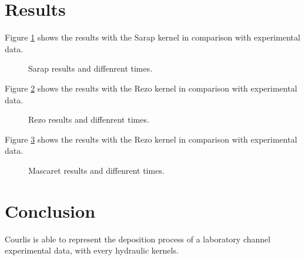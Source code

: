 \section{Results}

Figure \ref{soni:fig:sarap} shows the results with the Sarap kernel
in comparison with experimental data.

\begin{figure}[h]
 \centering
 \caption{Sarap results and diffenrent times.}
 \label{soni:fig:sarap}
\end{figure}

Figure \ref{soni:fig:rezo} shows the results with the Rezo kernel
in comparison with experimental data.

\begin{figure}[h]
 \centering
 \caption{Rezo results and diffenrent times.}
 \label{soni:fig:rezo}
\end{figure}

Figure \ref{soni:fig:mascaret} shows the results with the Rezo kernel
in comparison with experimental data.

\begin{figure}[h]
 \centering
 \caption{Mascaret results and diffenrent times.}
 \label{soni:fig:mascaret}
\end{figure}

\section{Conclusion}

Courlis is able to represent the deposition process 
of a laboratory channel 
experimental data, with every hydraulic kernels.
